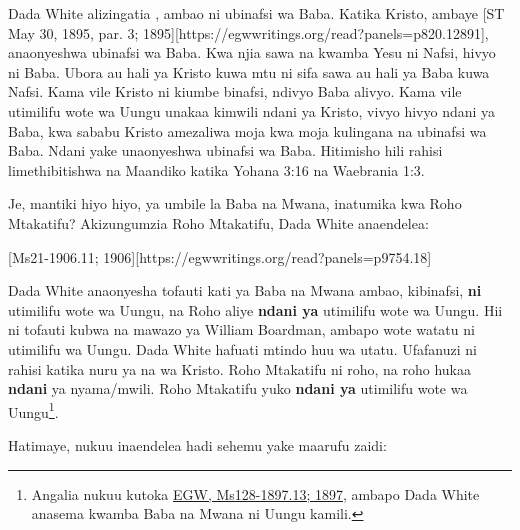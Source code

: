Dada White alizingatia , ambao ni ubinafsi wa Baba. Katika Kristo, ambaye [ST May 30, 1895, par. 3; 1895][https://egwwritings.org/read?panels=p820.12891], anaonyeshwa ubinafsi wa Baba. Kwa njia sawa na kwamba Yesu ni Nafsi, hivyo ni Baba. Ubora au hali ya Kristo kuwa mtu ni sifa sawa au hali ya Baba kuwa Nafsi. Kama vile Kristo ni kiumbe binafsi, ndivyo Baba alivyo. Kama vile utimilifu wote wa Uungu unakaa kimwili ndani ya Kristo, vivyo hivyo ndani ya Baba, kwa sababu Kristo amezaliwa moja kwa moja kulingana na ubinafsi wa Baba. Ndani yake unaonyeshwa ubinafsi wa Baba. Hitimisho hili rahisi limethibitishwa na Maandiko katika Yohana 3:16 na Waebrania 1:3.

Je, mantiki hiyo hiyo, ya umbile la Baba na Mwana, inatumika kwa Roho Mtakatifu? Akizungumzia Roho Mtakatifu, Dada White anaendelea:

[Ms21-1906.11; 1906][https://egwwritings.org/read?panels=p9754.18]

Dada White anaonyesha tofauti kati ya Baba na Mwana ambao, kibinafsi, \textbf{ni} utimilifu wote wa Uungu, na Roho aliye \textbf{ndani ya} utimilifu wote wa Uungu. Hii ni tofauti kubwa na mawazo ya William Boardman, ambapo wote watatu ni utimilifu wa Uungu. Dada White hafuati mtindo huu wa utatu. Ufafanuzi ni rahisi katika nuru ya  na wa Kristo. Roho Mtakatifu ni roho, na roho hukaa \textbf{ndani} ya nyama/mwili. Roho Mtakatifu yuko \textbf{ndani ya} utimilifu wote wa Uungu\footnote{Angalia nukuu kutoka \href{https://egwwritings.org/?ref=en_Ms128-1897.13&para=5426.19}{{EGW, Ms128-1897.13; 1897}}, ambapo Dada White anasema kwamba Baba na Mwana ni Uungu kamili.}.

Hatimaye, nukuu inaendelea hadi sehemu yake maarufu zaidi:

